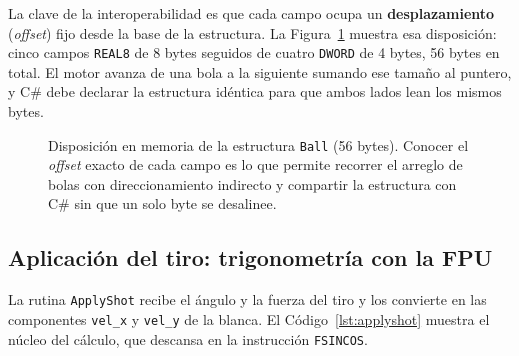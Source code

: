 \documentclass[a4paper,12pt]{article}
\begin{document}
La clave de la interoperabilidad es que cada campo ocupa un \textbf{desplazamiento} (\textit{offset}) fijo desde la base de la estructura. La Figura~\ref{fig:memball} muestra esa disposición: cinco campos \texttt{REAL8} de 8 bytes seguidos de cuatro \texttt{DWORD} de 4 bytes, 56 bytes en total. El motor avanza de una bola a la siguiente sumando ese tamaño al puntero, y C\# debe declarar la estructura idéntica para que ambos lados lean los mismos bytes.

\begin{figure}[H]
\centering
{}
\caption{Disposición en memoria de la estructura \texttt{Ball} (56 bytes). Conocer el \textit{offset} exacto de cada campo es lo que permite recorrer el arreglo de bolas con direccionamiento indirecto y compartir la estructura con C\# sin que un solo byte se desalinee.}
\label{fig:memball}
\end{figure}

\subsection{Aplicación del tiro: trigonometría con la FPU}
La rutina \texttt{ApplyShot} recibe el ángulo y la fuerza del tiro y los convierte en las componentes \texttt{vel\_x} y \texttt{vel\_y} de la blanca. El Código~\ref{lst:applyshot} muestra el núcleo del cálculo, que descansa en la instrucción \texttt{FSINCOS}.
\end{document}
